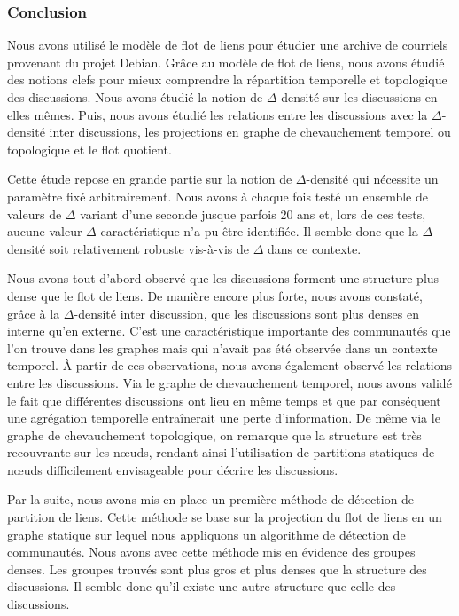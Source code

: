 \subsubsection{Conclusion}

Nous avons utilisé le modèle de flot de liens pour étudier une archive de courriels provenant du projet Debian.
Grâce au modèle de flot de liens, nous avons étudié des notions clefs pour mieux comprendre la répartition temporelle et topologique des discussions.
Nous avons étudié la notion de $\Delta$-densité sur les discussions en elles mêmes.
Puis, nous avons étudié les relations entre les discussions avec la $\Delta$-densité inter discussions, les projections en graphe de chevauchement temporel ou topologique et le flot quotient.

Cette étude repose en grande partie sur la notion de $\Delta$-densité qui nécessite un paramètre fixé arbitrairement.
Nous avons à chaque fois testé un ensemble de valeurs de $\Delta$ variant d'une seconde jusque parfois 20 ans et, lors de ces tests, aucune valeur $\Delta$ caractéristique n'a pu être identifiée.
Il semble donc que la $\Delta$-densité soit relativement robuste vis-à-vis de $\Delta$ dans ce contexte.

Nous avons tout d'abord observé que les discussions forment une structure plus dense que le flot de liens.
De manière encore plus forte, nous avons constaté, grâce à la  $\Delta$-densité inter discussion, que les discussions sont plus denses en interne qu'en externe.
C'est une caractéristique importante des communautés que l'on trouve dans les graphes mais qui n'avait pas été observée dans un contexte temporel.
\`A partir de ces observations, nous avons également observé les relations entre les discussions.
Via le graphe de chevauchement temporel, nous avons validé le fait que différentes discussions ont lieu en même temps et que par conséquent une agrégation temporelle entraînerait une perte d'information.
De même via le graphe de chevauchement topologique, on remarque que la structure est très recouvrante sur les n\oe{}uds, rendant ainsi l'utilisation de partitions statiques de n\oe{}uds difficilement envisageable pour décrire les discussions.


Par la suite, nous avons mis en place un première méthode de détection de partition de liens.
Cette méthode se base sur la projection du flot de liens en un graphe statique sur lequel nous appliquons un algorithme de détection de communautés.
Nous avons avec cette méthode mis en évidence des groupes denses.
Les groupes trouvés sont plus gros et plus denses que la structure des discussions.
Il semble donc qu'il existe une autre structure que celle des discussions.

